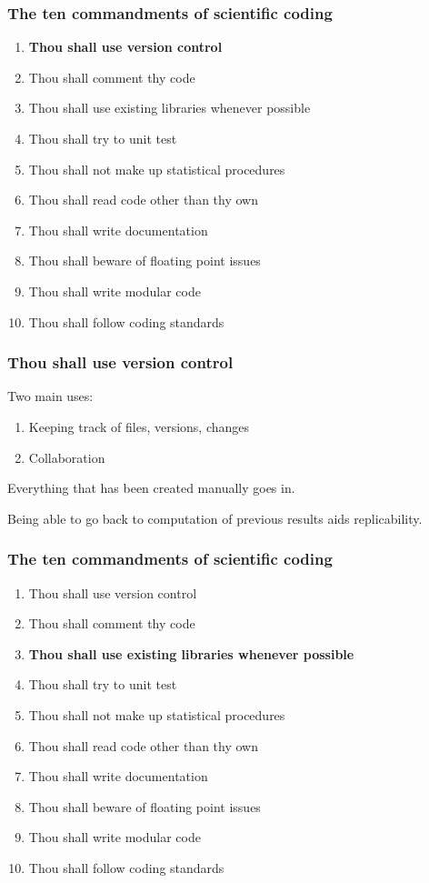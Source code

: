 \documentclass[slidestop]{beamer}
\begin{document}
\begin{frame}
  \frametitle{The ten commandments of scientific coding}
  \begin{enumerate}
    \item {\bf Thou shall use version control}
    \item Thou shall comment thy code
    \item Thou shall use existing libraries whenever possible
    \item Thou shall try to unit test
    \item Thou shall not make up statistical procedures
    \item Thou shall read code other than thy own
    \item Thou shall write documentation
    \item Thou shall beware of floating point issues
    \item Thou shall write modular code
    \item Thou shall follow coding standards
  \end{enumerate}
\end{frame}

\begin{frame}
  \frametitle{Thou shall use version control}
  Two main uses:
  \begin{enumerate}
    \item Keeping track of files, versions, changes
    \item Collaboration
  \end{enumerate}

  \vspace{1cm}

  Everything that has been created manually goes in.

  \vspace{1cm}

  Being able to go back to computation of previous results aids
  replicability.
\end{frame}

\begin{frame}
  \frametitle{The ten commandments of scientific coding}
  \begin{enumerate}
    \item Thou shall use version control
    \item Thou shall comment thy code
    \item {\bf Thou shall use existing libraries whenever possible}
    \item Thou shall try to unit test
    \item Thou shall not make up statistical procedures
    \item Thou shall read code other than thy own
    \item Thou shall write documentation
    \item Thou shall beware of floating point issues
    \item Thou shall write modular code
    \item Thou shall follow coding standards
  \end{enumerate}
\end{frame}
\end{document}
